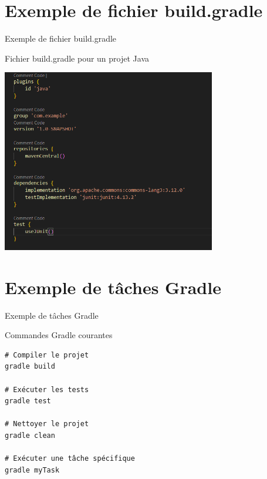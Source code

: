 \documentclass{clbeamer2024}
\begin{document}
	
	\section{Exemple de fichier build.gradle}
	\begin{frame}{Exemple de fichier build.gradle}
		\begin{exampleblock}{Fichier build.gradle pour un projet Java}
			
			\begin{center}
				\includegraphics[width=0.7\textwidth]{images/code1.png}
			\end{center}
			
		\end{exampleblock}
	\end{frame}
	
	
	\section{Exemple de tâches Gradle}
	\begin{frame}[fragile]{Exemple de tâches Gradle}
		\begin{exampleblock}{Commandes Gradle courantes}
			\begin{verbatim}
# Compiler le projet
gradle build
				
# Exécuter les tests
gradle test
				
# Nettoyer le projet
gradle clean
				
# Exécuter une tâche spécifique
gradle myTask
			\end{verbatim}
		\end{exampleblock}
	\end{frame}
	
	
\end{document}
